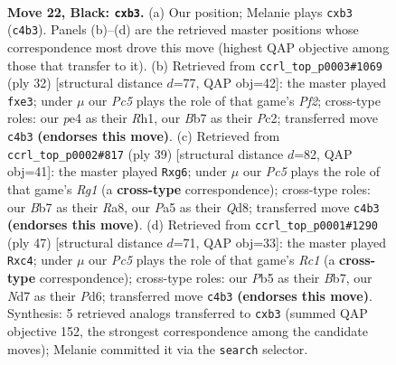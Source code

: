 \documentclass[11pt]{article}
\begin{document}
\clearpage

\begin{figure}[p]\centering
\begin{subfigure}{0.46\textwidth}\centering
\resizebox{\linewidth}{!}{%
\newchessgame
\chessboard[
  setfen={2r3k1/1bqn1p1p/r4Bp1/pp1Pp3/2p1P3/1BP3P1/P3KP1P/R1Q3NR b - - 0 22},
  showmover=false,
  pgfstyle=straightmove, color=movearrow, markmove={c4-b3}
]}
\caption{}
\end{subfigure}\hfill
\begin{subfigure}{0.46\textwidth}\centering
\resizebox{\linewidth}{!}{%
\newchessgame
\chessboard[
  setfen={r1bqk2r/1p3pp1/n2p3p/p2Pp3/4B1PP/PN2bQ2/1PP2P2/R3K2R w KQkq - 0 17},
  showmover=false,
  pgfstyle=straightmove, color=movearrow, markmove={f2-e3}
]}
\caption{}
\end{subfigure}
\\[4pt]
\begin{subfigure}{0.46\textwidth}\centering
\resizebox{\linewidth}{!}{%
\newchessgame
\chessboard[
  setfen={r2q1kr1/pp2bp2/4pnB1/2pp3p/3P1B1P/2P2PP1/PP6/R1NQK2R b KQ - 0 20},
  showmover=false,
  pgfstyle=straightmove, color=movearrow, markmove={g8-g6}
]}
\caption{}
\end{subfigure}\hfill
\begin{subfigure}{0.46\textwidth}\centering
\resizebox{\linewidth}{!}{%
\newchessgame
\chessboard[
  setfen={2r4r/1b2k3/1q1pppp1/pp5p/2B1P2P/P1P2P2/1P1QN1P1/1K1R3R b - - 0 24},
  showmover=false,
  pgfstyle=straightmove, color=movearrow, markmove={c8-c4}
]}
\caption{}
\end{subfigure}
\caption{\textbf{Move 22, Black: \texttt{cxb3}.} (a) Our position; Melanie plays \texttt{cxb3} (\texttt{c4b3}). Panels (b)--(d) are the retrieved master positions whose correspondence most drove this move (highest QAP objective among those that transfer to it). (b) Retrieved from \texttt{ccrl\_top\_p0003\#1069} (ply 32) [structural distance $d$=77, QAP obj=42]: the master played \texttt{fxe3}; under $\mu$ our \emph{Pc5} plays the role of that game's \emph{Pf2}; cross-type roles: our \emph{p}e4 as their \emph{R}h1, our \emph{B}b7 as their \emph{P}c2; transferred move \texttt{c4b3} \textbf{(endorses this move)}. (c) Retrieved from \texttt{ccrl\_top\_p0002\#817} (ply 39) [structural distance $d$=82, QAP obj=41]: the master played \texttt{Rxg6}; under $\mu$ our \emph{Pc5} plays the role of that game's \emph{Rg1} (a \textbf{cross-type} correspondence); cross-type roles: our \emph{B}b7 as their \emph{R}a8, our \emph{P}a5 as their \emph{Q}d8; transferred move \texttt{c4b3} \textbf{(endorses this move)}. (d) Retrieved from \texttt{ccrl\_top\_p0001\#1290} (ply 47) [structural distance $d$=71, QAP obj=33]: the master played \texttt{Rxc4}; under $\mu$ our \emph{Pc5} plays the role of that game's \emph{Rc1} (a \textbf{cross-type} correspondence); cross-type roles: our \emph{P}b5 as their \emph{B}b7, our \emph{N}d7 as their \emph{P}d6; transferred move \texttt{c4b3} \textbf{(endorses this move)}. Synthesis: 5 retrieved analogs transferred to \texttt{cxb3} (summed QAP objective 152, the strongest correspondence among the candidate moves); Melanie committed it via the \texttt{search} selector.}
\label{fig:thought-m43}
\end{figure}
\end{document}
